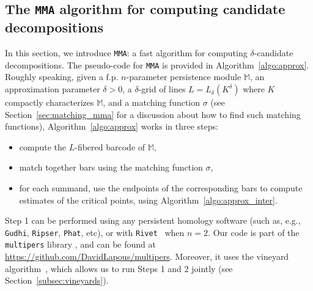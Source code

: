 \documentclass{article}
\newcommand{\Mbb}{\mathbb{M}}
\newcommand{\MMA}{\texttt{MMA}}
\newcommand{\mmaout}{candidate}
\newcommand{\compacityassumption}{compactly characterizes}
\newcommand{\rebuttal}[1]{{ #1}}
\begin{document}
\subsection{The \MMA{} algorithm for computing candidate decompositions}\label{subsec:Algorithms}


In this section, we introduce \MMA: a fast algorithm for computing $\delta$-\mmaout{} decompositions. The pseudo-code for \MMA{} is provided in Algorithm~\ref{algo:approx}.
Roughly speaking, given a \rebuttal{f.p. $n$-parameter persistence module $\Mbb$, an approximation parameter $\delta >0$, a $\delta$-grid of lines $L=L_\delta(K^\delta)$ where $K$
\compacityassumption{} $\Mbb$}, and a matching function $\sigma$
(see Section~\ref{sec:matching_mma} for a discussion about how to find such matching functions), Algorithm~\ref{algo:approx} works in three steps: \\

\begin{itemize}[left=1.5cm]
	\item[Step 1:] compute the $L$-fibered barcode of $\Mbb$,
	\item[Step 2:] match together bars
		using the matching function $\sigma$, %
	\item[Step 3:] for each summand, use the endpoints of the corresponding bars to compute estimates of the critical points, using Algorithm~\ref{algo:approx_inter}. \\
\end{itemize}

Step 1 can be performed using any persistent homology software (such as, e.g., \texttt{Gudhi}, \texttt{Ripser}, \texttt{Phat}, etc),
or with \texttt{Rivet}~\cite{lesnickInteractiveVisualization2D2015} when $n=2$. %
Our code is part of the \texttt{multipers} library \cite{loiseauxMultipersMultiparameterPersistence2024}, and can be found at
\url{https://github.com/DavidLapous/multipers}. Moreover, it uses the vineyard algorithm~\cite{cohen-steinerVinesVineyardsUpdating2006}, which allows us to run Steps 1 and 2 jointly
(see Section~\ref{subsec:vineyards}).
\end{document}
